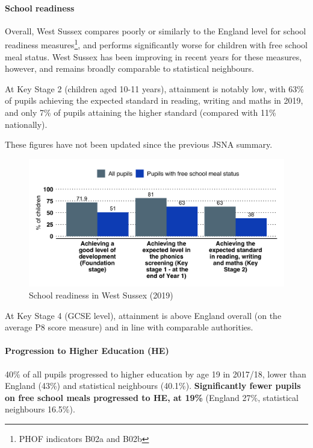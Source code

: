 \paragraph{School readiness} Overall, West Sussex compares poorly or similarly to the England level for school readiness measures\footnote{PHOF indicators B02a and B02b}, and performs significantly worse for children with free school meal status. West Sussex has been improving in recent years for these measures, however, and remains broadly comparable to statistical neighbours.

At Key Stage 2 (children aged 10-11 years), attainment is notably low, with 63\% of pupils achieving the expected standard in reading, writing and maths in 2019, and only 7\% of pupils attaining the higher standard (compared with 11\% nationally).

These figures have not been updated since the previous JSNA summary.

\begin{figure}[htp]
    \centering
    \caption{School readiness in West Sussex (2019)}
    \includegraphics[width = \linewidth]{images/02_school_readiness_2019.png}
\end{figure}

At Key Stage 4 (GCSE level), attainment is above England overall (on the average P8 score measure) and in line with comparable authorities.

\paragraph{Progression to Higher Education (HE)} 40\% of all pupils progressed to higher education by age 19 in 2017/18, lower than England (43\%) and statistical neighbours (40.1\%). {\bfseries Significantly fewer pupils on free school meals progressed to HE, at 19\%} (England 27\%, statistical neighbours 16.5\%).


